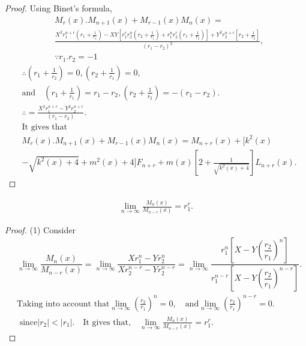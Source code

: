 \begin{proof}
Using Binet's formula,
\begin{align*}
&M_{r}(x).M_{n+1}(x)+M_{r-1}(x)M_{n}(x)=\\
&\frac{X^2r_{1}^{n+r}(r_{1}+\frac{1}{r_{1}})-XY[r_{1}^rr_{2}^n(r_{2}+\frac{1}{r_{1}})+r_{1}^nr_{2}^r(r_{1}+\frac{1}{r_{2}})]+Y^2r_{2}^{n+r}[r_{2}+\frac{1}{r_{2}}]}{(r_{1}-r_{2})^2},\\
&\because r_{1}.r_{2}=-1
\end{align*}
\begin{align*}
 &\therefore (r_{1}+\frac{1}{r_{2}})=0,(r_{2}+\frac{1}{r_{1}})=0,\\
 &\text{and}\quad (r_{1}+\frac{1}{r_{1}})=r_{1}-r_{2},(r_{2}+\frac{1}{r_{2}})=-(r_{1}-r_{2}).\\
&\therefore =\frac{X^{2}r_{1}^{n+r}-Y^{2}r_{2}^{n+r}}{(r_{1}-r_{2})}.\\
&\text{It gives that} \\
&M_{r}(x).M_{n+1}(x)+M_{r-1}(x)M_{n}(x)=M_{n+r}(x)+[k^2(x)\\
&-\sqrt{k^{2}(x)+4}+m^{2}(x)+4]F_{n+r}+m(x)[2+\frac{1}{\sqrt{k^{2}(x)+4}}]L_{n+r}(x).
\end{align*}
\end{proof}
\begin{theorem}
\begin{align*}
\lim_{n \to \infty }\frac{M_{n}(x)}{M_{n-r}(x)}=r_{1}^r.
\end{align*}
\end{theorem}
\begin{proof}(1)
Consider
\begin{align*}
&\lim_{n \to \infty }\dfrac{M_{n}(x)}{M_{n-r}(x)} =\lim_{n \to \infty }\dfrac{Xr_{1}^n-Yr_{2}^n}{Xr_{2}^{n-r}-Yr_{2}^{n-r}}=\lim_{n \to \infty }\dfrac{r_{1}^n[X-Y(\dfrac{r_{2}}{r_{1}})^n]}{r_{1}^{n-r}[X-Y(\dfrac{r_{2}}{r_{1}})^{n-r}]}.\\
&\text{Taking into account that} \lim_{n \to \infty }(\frac{r_{2}}{r_{1}})^n=0, \quad\text{and} \lim_{n \to \infty }(\frac{r_{2}}{r_{1}})^{n-r}=0.\\& \text{ since}
{|r_{2}|}<|r_{1}|. \quad\text{It gives that,}\quad
\lim_{n \to \infty }\frac{M_{n}(x)}{M_{n-r}(x)}= r_{1}^r.
\end{align*}
\end{proof}
